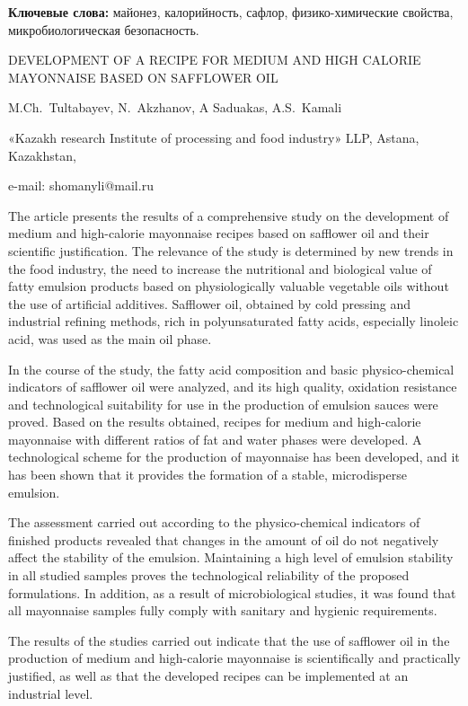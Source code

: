 {\bfseries Ключевые слова:} майонез, калорийность, сафлор,
физико-химические свойства, микробиологическая безопасность.

\begin{header}
DEVELOPMENT OF A RECIPE FOR MEDIUM AND HIGH CALORIE MAYONNAISE BASED ON SAFFLOWER OIL

M.Ch.~Tultabayev\envelope,
N.~Akzhanov,
A Saduakas,
A.S.~Kamali
\end{header}

\begin{affil}
«Kazakh research Institute of processing and food industry» LLP, Astana, Kazakhstan,

e-mail: shomanyli@mail.ru
\end{affil}

The article presents the results of a comprehensive study on the
development of medium and high-calorie mayonnaise recipes based on
safflower oil and their scientific justification. The relevance of the
study is determined by new trends in the food industry, the need to
increase the nutritional and biological value of fatty emulsion products
based on physiologically valuable vegetable oils without the use of
artificial additives. Safflower oil, obtained by cold pressing and
industrial refining methods, rich in polyunsaturated fatty acids,
especially linoleic acid, was used as the main oil phase.

In the course of the study, the fatty acid composition and basic
physico-chemical indicators of safflower oil were analyzed, and its high
quality, oxidation resistance and technological suitability for use in
the production of emulsion sauces were proved. Based on the results
obtained, recipes for medium and high-calorie mayonnaise with different
ratios of fat and water phases were developed. A technological scheme
for the production of mayonnaise has been developed, and it has been
shown that it provides the formation of a stable, microdisperse
emulsion.

The assessment carried out according to the physico-chemical indicators
of finished products revealed that changes in the amount of oil do not
negatively affect the stability of the emulsion. Maintaining a high
level of emulsion stability in all studied samples proves the
technological reliability of the proposed formulations. In addition, as
a result of microbiological studies, it was found that all mayonnaise
samples fully comply with sanitary and hygienic requirements.

The results of the studies carried out indicate that the use of
safflower oil in the production of medium and high-calorie mayonnaise is
scientifically and practically justified, as well as that the developed
recipes can be implemented at an industrial level.

